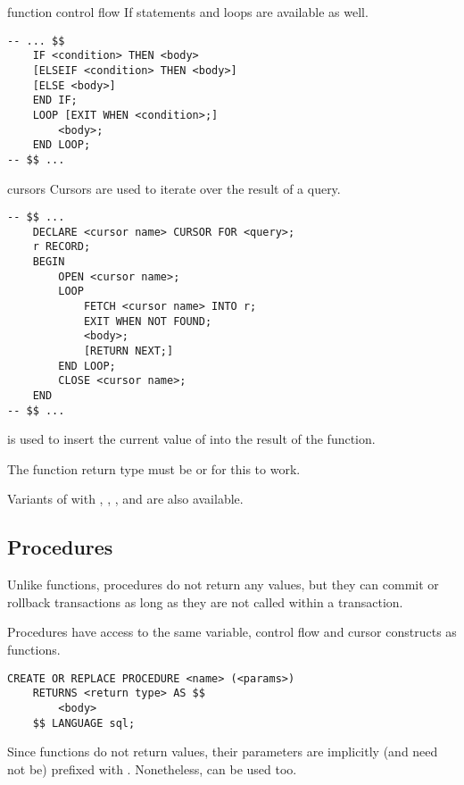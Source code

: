 \begin{defn}{function control flow}
    If statements and loops are available as well.

    \begin{lstlisting}
-- ... $$
    IF <condition> THEN <body>
    [ELSEIF <condition> THEN <body>]
    [ELSE <body>]
    END IF;
    LOOP [EXIT WHEN <condition>;]
        <body>;
    END LOOP;
-- $$ ...
\end{lstlisting}
\end{defn}

\begin{defn}{cursors}
    Cursors are used to iterate over the result of a query.
    \begin{lstlisting}
-- $$ ...
    DECLARE <cursor name> CURSOR FOR <query>;
    r RECORD;
    BEGIN
        OPEN <cursor name>;
        LOOP
            FETCH <cursor name> INTO r;
            EXIT WHEN NOT FOUND;
            <body>;
            [RETURN NEXT;]
        END LOOP;
        CLOSE <cursor name>;
    END
-- $$ ...
\end{lstlisting}

     is used to insert the current value of  into the result of the function.

    The function return type must be  or  for this to work.

    Variants of  with , , ,  and  are also available.
\end{defn}

\subsection{Procedures}
Unlike functions, procedures do not return any values, but they can commit or rollback transactions as long as they are not called within a transaction.

Procedures have access to the same variable, control flow and cursor constructs as functions.

\begin{lstlisting}
CREATE OR REPLACE PROCEDURE <name> (<params>)
    RETURNS <return type> AS $$
        <body>
    $$ LANGUAGE sql;
\end{lstlisting}

Since functions do not return values, their parameters are implicitly (and need not be) prefixed with . Nonetheless,  can be used too.

